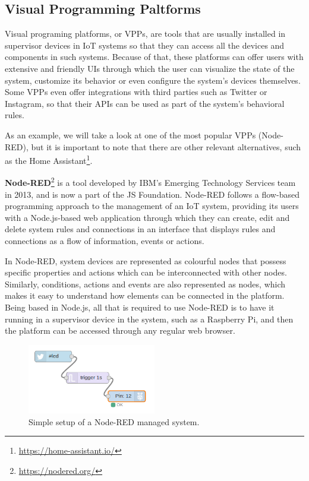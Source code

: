 \documentclass[runningheads]{llncs}
\begin{document}
\subsection{Visual Programming Paltforms}

Visual programing platforms, or VPPs, are tools that are usually installed in supervisor devices in IoT systems so that they can access all the devices and components in such systems. Because of that, these platforms can offer users with extensive and friendly UIs through which the user can visualize the state of the system, customize its behavior or even configure the system’s devices themselves. Some VPPs even offer integrations with third parties such as Twitter or Instagram, so that their APIs can be used as part of the system’s behavioral rules.

As an example, we will take a look at one of the most popular VPPs (Node-RED), but it is important to note that there are other relevant alternatives, such as the Home Assistant\footnote{\url{https://home-assistant.io/}}.

\textbf{Node-RED}\footnote{\url{https://nodered.org/}} is a tool developed by IBM’s Emerging Technology Services team in 2013, and is now a part of the JS Foundation. Node-RED follows a flow-based programming approach to the management of an IoT system, providing its users with a Node.js-based web application through which they can create, edit and delete system rules and connections in an interface that displays rules and connections as a flow of information, events or actions.

In Node-RED, system devices are represented as colourful nodes that possess specific properties and actions which can be interconnected with other nodes. Similarly, conditions, actions and events are also represented as nodes, which makes it easy to understand how elements can be connected in the platform. Being based in Node.js, all that is required to use Node-RED is to have it running in a supervisor device in the system, such as a Raspberry Pi, and then the platform can be accessed through any regular web browser.

\begin{figure}
    \begin{center}
        \includegraphics[width=0.5\textwidth]{figures/nodered-simple.jpg}
        \caption{Simple setup of a Node-RED managed system.} \label{fig:nodered-simple}
    \end{center}
\end{figure}
\end{document}
